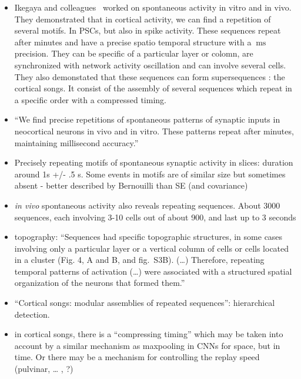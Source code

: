 \documentclass[brainsci, %
               review,submit,pdftex,moreauthors%
               ]{Definitions/mdpi}
\newcommand{\ms}{\si{\milli\second}}%
\begin{document}
\begin{itemize}
 \item
  Ikegaya and colleagues~\citep{ikegaya_synfire_2004} worked on spontaneous activity in vitro and in vivo. They demonstrated that in cortical activity, we can find a repetition of several motifs. In PSCs, but also in spike activity. These sequences repeat after minutes and have a precise spatio temporal structure with a $~\ms$ precision. They can be specific of a particular layer or colomn, are synchronized with network activity oscillation and can involve several cells. They also demonstated that these sequences can form supersequences : the cortical songs. It consist of the assembly of several sequences which repeat in a specific order with a compressed timing.
\item
  ``We find precise repetitions of spontaneous patterns of synaptic inputs in neocortical neurons in vivo and in vitro. These patterns repeat after minutes, maintaining millisecond accuracy.''
\item
  Precisely repeating motifs of spontaneous synaptic activity in slices: duration around 1s +/- .5 s. Some events in motifs are of similar size but sometimes absent - better described by Bernouilli than SE (and covariance)
\item
  \emph{in vivo} spontaneous activity also reveals repeating sequences. About 3000 sequences, each involving 3-10 cells out of about 900, and last up to 3 seconds
\item
  topography: ``Sequences had specific topographic structures, in some cases involving only a particular layer or a vertical column of cells or cells located in a cluster (Fig. 4, A and B, and fig.~S3B). (\ldots) Therefore, repeating temporal patterns of activation (\ldots) were associated with a structured spatial organization of the neurons that formed them.''
\item
  ``Cortical songs: modular assemblies of repeated sequences'': hierarchical detection.
\item
  in cortical songs, there is a ``compressing timing'' which may be taken into account by a similar mechanism as maxpooling in CNNs for space, but in time. Or there may be a mechanism for controlling the replay speed (pulvinar, \ldots{} , ?)
\end{itemize}
\end{document}

